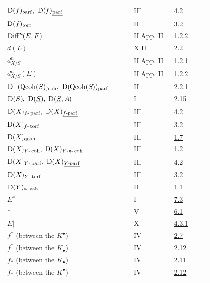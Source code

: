 \begin{longtable}{@{}>{\raggedright\arraybackslash}p{0.50\linewidth}>{\raggedright\arraybackslash}p{0.17\linewidth}>{\raggedright\arraybackslash}p{0.15\linewidth}@{}}
\(\Dcat(f)_{\parf},\ \Dcat(f)_{\underline{\mathrm{parf}}}\) & III & \hyperlink{sga6.e03.notation.4-2}{4.2}\\
\(\mathrm D(f)_{\operatorname{torf}}\) & III & \hyperlink{sga6.e03.notation.3-2}{3.2}\\
\(\operatorname{Diff}^n(E,F)\) & II App. II & \hyperlink{sga6.e02.para.1-2-2}{1.2.2}\\
\(d(L)\) & XIII & \hyperlink{sga6.e13.para.2-2}{2.2}\\
\(d^n_{X/S}\) & II App. II & \hyperlink{sga6.e02.para.1-2-1}{1.2.1}\\
\(d^n_{X/S}(E)\) & II App. II & \hyperlink{sga6.e02.para.1-2-2}{1.2.2}\\
\(\Dcat^{-}(\Qcoh(S))_{\coh},\ \Dcat(\Qcoh(S))_{\parf}\) & II & \hyperlink{sga6.e02.notation.2-2-1}{2.2.1}\\
\(\Dcat(S),\ \Dcat(\underline S),\ \Dcat(\underline S,A)\) & I & \hyperlink{sga6.e01.ex.2-15}{2.15}\\
\(\Dcat(X)_{f\text{-}\parf},\ \Dcat(X)_{\underline{f\text{-}\mathrm{parf}}}\) & III & \hyperlink{sga6.e03.notation.4-2}{4.2}\\
\(\mathrm D(X)_{f\text{-}\operatorname{torf}}\) & III & \hyperlink{sga6.e03.notation.3-2}{3.2}\\
\(\mathrm D(X)_{\operatorname{qcoh}}\) & III & \hyperlink{sga6.e03.lem.1-7}{1.7}\\
\(\Dcat(X)_{Y\text{-}\coh},\ \Dcat(X)_{Y\text{-}n\text{-}\coh}\) & III & \hyperlink{sga6.e03.def.1-2}{1.2}\\
\(\Dcat(X)_{Y\text{-}\parf},\ \Dcat(X)_{\underline{Y\text{-}\mathrm{parf}}}\) & III & \hyperlink{sga6.e03.notation.4-2}{4.2}\\
\(\mathrm D(X)_{Y\text{-}\operatorname{torf}}\) & III & \hyperlink{sga6.e03.notation.3-2}{3.2}\\
\(\mathrm D(Y)_{n\text{-}\operatorname{coh}}\) & III & \hyperlink{sga6.e03.thm.1-1}{1.1}\\
\(E^\vee\) & I & \hyperlink{sga6.e01.def.7-3}{7.3}\\
\(*\) & V & \hyperlink{sga6.e05.para.6-1}{6.1}\\
\(E|\) & X & \hyperlink{sga6.e10.prop.4-3-1}{4.3.1}\\
\(f^*\) (between the \(K^\bullet\)) & IV & \hyperlink{sga6.e04.para.2-7}{2.7}\\
\(f^*\) (between the \(K_\bullet\)) & IV & \hyperlink{sga6.e04.para.2-12}{2.12}\\
\(f_*\) (between the \(K_\bullet\)) & IV & \hyperlink{sga6.e04.para.2-11}{2.11}\\
\(f_*\) (between the \(K^\bullet\)) & IV & \hyperlink{sga6.e04.para.2-12}{2.12}\\

\end{longtable}
